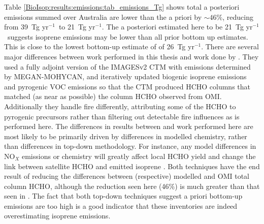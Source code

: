 \documentclass[acp, manuscript]{copernicus}
\newcommand{\parencite}{\citep}
\newcommand{\textcite}{\citet}
\newcommand{\tgpyr}{~Tg yr$^{-1}$}
\begin{document}
      Table \ref{BioIsop:results:emissions:tab_emissions_Tg} shows total a posteriori emissions summed over Australia are lower than the a priori by $\sim{46}\%$, reducing from 39\tgpyr ~to 21\tgpyr.
      The a posteriori estimated here to be 21\tgpyr ~suggests isoprene emissions may be lower than all prior bottom up estimates. This is close to the lowest bottom-up estimate of \textcite{Bauwens2016} of 26\tgpyr.
      There are several major differences between work performed in this thesis and work done by \textcite{Bauwens2016}. 
      They used a fully adjoint version of the IMAGESv2 CTM with emissions determined by MEGAN-MOHYCAN, and iteratively updated biogenic isoprene emissions and pyrogenic VOC emissions so that the CTM produced HCHO columns that matched (as near as possible) the column HCHO observed from OMI.
      Additionally they handle fire differently, attributing some of the HCHO to pyrogenic precursors rather than filtering out detectable fire influences as is performed here.
      The differences in results between \textcite{Bauwens2016} and work performed here are most likely to be primarily driven by differences in modelled chemistry, rather than differences in top-down methodology.
      For instance, any model differences in NO$_X$ emissions or chemistry will greatly affect local HCHO yield and change the link between satellite HCHO and emitted isoprene \parencite[e.g.,][]{Kaiser2018}.
      Both techniques have the end result of reducing the differences between (respective) modelled and OMI total column HCHO, although the reduction seen here (46\%) is much greater than that seen in \textcite{Bauwens2016}.
      The fact that both top-down techniques suggest a priori bottom-up emissions are too high is a good indicator that these inventories are indeed overestimating isoprene emissions.
      
      
      
      
      
\end{document}
